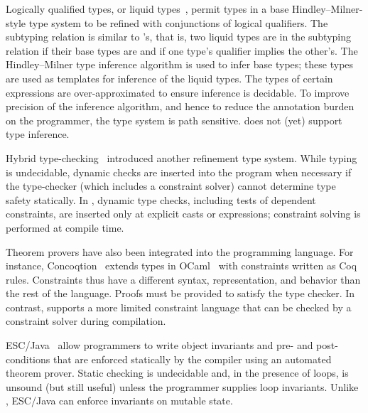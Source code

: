 

Logically qualified types, or liquid types~\cite{liquid-types},
permit types in a base Hindley--Milner-style type system to be refined with
conjunctions of logical qualifiers.  The subtyping relation is similar to
\Xten{}'s, that is, two liquid types are in the subtyping relation if their base
types are and if one type's qualifier implies the other's.
The Hindley--Milner type
inference algorithm is used to infer base types; these types are used as templates for inference of the liquid types.
The types of certain expressions are over-approximated to ensure inference
is decidable.
To improve precision of the inference algorithm, and hence
to reduce the annotation burden on the programmer, 
the type system is path sensitive.  \Xten{} does not (yet) support type
inference.

Hybrid type-checking~\cite{flanagan-popl06,flanagan-fool06}
introduced another refinement type system.
While typing is undecidable, dynamic checks are inserted into
the program when necessary if the type-checker (which
includes a constraint solver) cannot determine
type safety statically.
In \Xten{}, dynamic type checks, including tests of dependent
constraints, are inserted only at explicit casts or
 expressions; constraint solving is performed at compile time.


Theorem provers have also been integrated into the programming language.
For instance,
Concoqtion~\cite{concoqtion} extends types in OCaml~\cite{ocaml}
with constraints written as Coq~\cite{coq} rules.
Constraints thus have a different
syntax, representation, and behavior than the rest of the language.
Proofs must be provided to satisfy the type checker.
In contrast, 
\Xten{} supports a more limited constraint language 
that can be checked by a
constraint solver during compilation.

ESC/Java~\cite{esc-java}
allow programmers to write object invariants and pre- and
post-conditions that are enforced statically
by the compiler using an automated theorem prover.
Static checking is undecidable and, in the presence of loops,
is unsound (but still useful) unless the programmer supplies loop invariants.
Unlike \Xten{},
ESC/Java can enforce invariants on mutable state.


